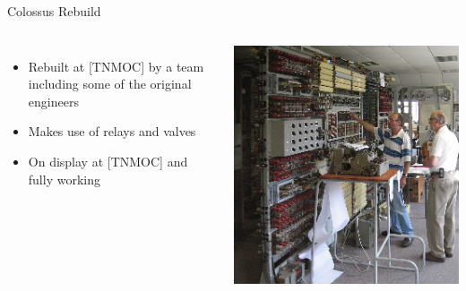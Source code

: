 \documentclass{beamer}
\begin{document}
\begin{frame}{Colossus Rebuild}
  \begin{columns}
    
    \begin{itemize}
    \item
      Rebuilt at [TNMOC] by a team including some of the original engineers
    \item
      Makes use of relays and valves
    \item
      On display at [TNMOC] and fully working
    \end{itemize}
    
    \begin{center}
      \includegraphics[scale=0.75]{../assets/ColossusRebuild_11.eps}
      \cite{ColossusRebuild}
    \end{center}
    
  \end{columns}
\end{frame}
\end{document}
